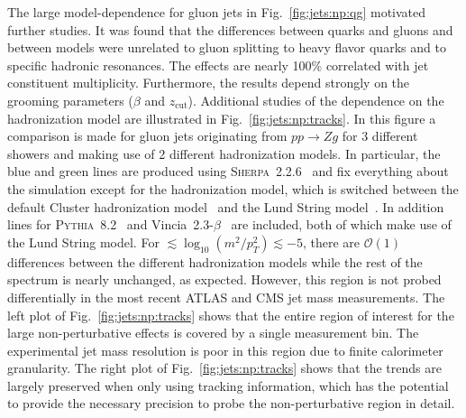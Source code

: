 \documentclass[11pt]{cernrep}
\begin{document}
The large model-dependence for gluon jets in Fig.~\ref{fig:jets:np:qg} motivated further studies.  It was found that the differences between quarks and gluons and between models were unrelated to gluon splitting to heavy flavor quarks and to specific hadronic resonances.  The effects are nearly 100\% correlated with jet constituent multiplicity.  Furthermore, the results depend strongly on the grooming parameters ($\beta$ and $z_\text{cut}$).  Additional studies of the dependence on the hadronization model are illustrated in Fig.~\ref{fig:jets:np:tracks}. In this figure a comparison is made for gluon jets originating from $pp\to Zg$ for 3 different showers and making use of 2 different hadronization models.  In particular, the blue and green lines are produced using \textsc{Sherpa}~2.2.6~\cite{Bothmann:2019yzt} and fix everything about the simulation except for the hadronization model, which is switched between the default Cluster hadronization model~\cite{Winter:2003tt} and the Lund String model~\cite{Sjostrand:1982fn}. In addition lines for \textsc{Pythia}~8.2~\cite{Sjostrand:2014zea} and Vincia~2.3-$\beta$~\cite{Fischer:2016vfv} are included, both of which make use of the Lund String model. For $\lesssim\log_{10}(m^2/p_T^2)\lesssim -5$, there are $\mathcal{O}(1)$ differences between the different hadronization models while the rest of the spectrum is nearly unchanged, as expected.  However, this region is not probed differentially in the most recent ATLAS and CMS jet mass measurements.  The left plot of Fig.~\ref{fig:jets:np:tracks} shows that the entire region of interest for the large non-perturbative effects is covered by a single measurement bin.  The experimental jet mass resolution is poor in this region due to finite calorimeter granularity.  The right plot of Fig.~\ref{fig:jets:np:tracks} shows that the trends are largely preserved when only using tracking information, which has the potential to provide the necessary precision to probe the non-perturbative region in detail.
\end{document}

